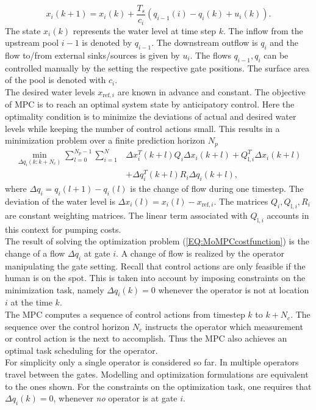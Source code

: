 \documentclass[a4paper,twoside, openright,12pt]{report}
\begin{document}
\begin{equation}
x_i(k+1) = x_i(k) + \frac{T_s}{c_i}(q_{i-1}(i) - q_i(k) + u_i(k)).
\end{equation}
The state $x_i(k)$ represents the water level at time step $k$. The inflow from the upstream pool $i-1$ is denoted by $q_{i-1}$. The downstream outflow is $q_i$ and the flow to/from external sinks/sources is given by $u_i$. The flows $q_{i-1},q_i$ can be controlled manually by the setting the respective gate positions. The surface area of the pool is denoted with $c_i$.\\
The desired water levels $x_{\mathrm{ref},i}$ are known in advance and constant. The objective of MPC is to reach an optimal system state by anticipatory control. Here the optimality condition is to minimize the deviations of actual and desired water levels while keeping the number of control actions small. This results in a minimization problem over a finite prediction horizon $N_p$ \begin{align}\label{EQ:MoMPCcostfunction}
\min_{\Delta q_i (k:k+N_c)} \sum_{l=0}^{N_p-1} \sum_{i=1}^{N} &\Delta x_i^T(k+l) Q_i \Delta x_i(k+l) + Q_{\mathrm{l},i}^T \Delta x_i(k+l) \\  &+ \Delta q_i^T(k+l) R_i \Delta q_i(k+l) \nonumber,
\end{align}
where $\Delta q_i = q_i(l+1) - q_i(l)$ is the change of flow during one timestep. The deviation of the water level is $\Delta x_i (l) = x_i(l) - x_{\mathrm{ref},i}$. The matrices $Q_i,Q_{\mathrm{l},i},R_i$ are constant weighting matrices. The linear term associated with $Q_{\mathrm{l},i}$ accounts in this context for pumping costs.\\
 The result of solving the optimization problem (\ref{EQ:MoMPCcostfunction}) is the change of a flow $\Delta q_i$ at gate $i$. A change of flow is realized by the operator manipulating the gate setting.  Recall that control actions are only feasible if the human is on the spot. This is taken into account by imposing constraints on the minimization task, namely $\Delta q_i(k) = 0$ whenever the operator is not at location $i$ at the time $k$.\\ 
The MPC computes a sequence of control actions from timestep $k$ to $k+N_c$. The sequence over the control horizon $N_c$ instructs the operator which measurement or control action is the next to accomplish. Thus the MPC also achieves an optimal task scheduling for the operator.\\
For simplicity only a single operator is considered so far. In \cite{vanOverloop2015} multiple operators travel between the gates. Modelling and optimization formulations are equivalent to the ones shown. For the constraints on the optimization task, one requires that $\Delta q_i(k)=0$, whenever \emph{no} operator is at gate $i$. 
\end{document}
